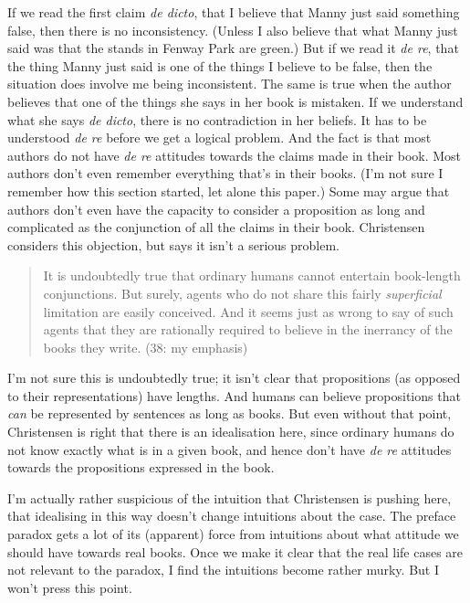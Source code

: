 \documentclass[
  11pt,
  letterpaper,
  DIV=11,
  numbers=noendperiod,
  oneside]{scrartcl}
\begin{document}
If we read the first claim \emph{de dicto}, that I believe that Manny
just said something false, then there is no inconsistency. (Unless I
also believe that what Manny just said was that the stands in Fenway
Park are green.) But if we read it \emph{de re}, that the thing Manny
just said is one of the things I believe to be false, then the situation
does involve me being inconsistent. The same is true when the author
believes that one of the things she says in her book is mistaken. If we
understand what she says \emph{de dicto}, there is no contradiction in
her beliefs. It has to be understood \emph{de re} before we get a
logical problem. And the fact is that most authors do not have \emph{de
re} attitudes towards the claims made in their book. Most authors don't
even remember everything that's in their books. (I'm not sure I remember
how this section started, let alone this paper.) Some may argue that
authors don't even have the capacity to consider a proposition as long
and complicated as the conjunction of all the claims in their book.
Christensen considers this objection, but says it isn't a serious
problem.

\begin{quote}
It is undoubtedly true that ordinary humans cannot entertain book-length
conjunctions. But surely, agents who do not share this fairly
\emph{superficial} limitation are easily conceived. And it seems just as
wrong to say of such agents that they are rationally required to believe
in the inerrancy of the books they write. (38: my emphasis)
\end{quote}

I'm not sure this is undoubtedly true; it isn't clear that propositions
(as opposed to their representations) have lengths. And humans can
believe propositions that \emph{can} be represented by sentences as long
as books. But even without that point, Christensen is right that there
is an idealisation here, since ordinary humans do not know exactly what
is in a given book, and hence don't have \emph{de re} attitudes towards
the propositions expressed in the book.

I'm actually rather suspicious of the intuition that Christensen is
pushing here, that idealising in this way doesn't change intuitions
about the case. The preface paradox gets a lot of its (apparent) force
from intuitions about what attitude we should have towards real books.
Once we make it clear that the real life cases are not relevant to the
paradox, I find the intuitions become rather murky. But I won't press
this point.
\end{document}

